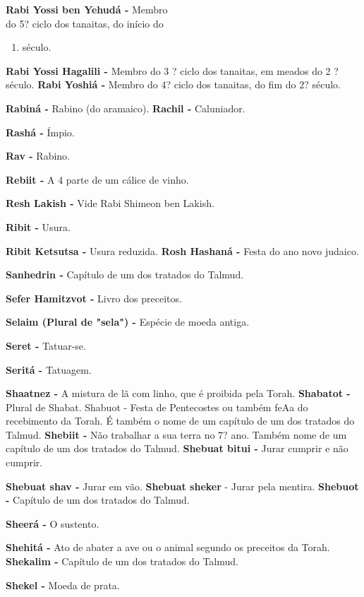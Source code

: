 \textbf{Rabi Yossi ben Yehudá -} Membro\\
do 5? ciclo dos tanaitas, do início do

\begin{enumerate}
\def\labelenumi{\arabic{enumi}.}
\setcounter{enumi}{2}
\item
  século.
\end{enumerate}

\textbf{Rabi Yossi Hagalili -} Membro do 3 ? ci­clo dos tanaitas, em
meados do 2 ? século. \textbf{Rabi Yoshiá -} Membro do 4? ciclo dos
tanaitas, do fim do 2? século.

\textbf{Rabiná -} Rabino (do aramaico). \textbf{Rachil -} Caluniador.

\textbf{Rashá -} Ímpio.

\textbf{Rav -} Rabino.

\textbf{Rebiit -} A 4 parte de um cálice de vinho.

\textbf{Resh Lakish -} Vide Rabi Shimeon ben Lakish.

\textbf{Ribit -} Usura.

\textbf{Ribit Ketsutsa -} Usura reduzida. \textbf{Rosh Hashaná -} Festa
do ano novo ju­daico.

\textbf{Sanhedrin -} Capítulo de um dos tra­tados do Talmud.

\textbf{Sefer Hamitzvot -} Livro dos precei­tos.

\textbf{Selaim (Plural de "sela") -} Espécie de moeda antiga.

\textbf{Seret -} Tatuar-se.

\textbf{Seritá -} Tatuagem.

\textbf{Shaatnez -} A mistura de lã com linho, que é proibida pela
Torah. \textbf{Shabatot -} Plural de Shabat. Shabuot - Festa de
Pentecostes ou também feAa do recebimento da To­rah. É também o nome de
um capítu­lo de um dos tratados do Talmud. \textbf{Shebiit -} Não
trabalhar a sua terra no 7? ano. Também nome de um capítu­lo de um dos
tratados do Talmud. \textbf{Shebuat bitui -} Jurar cumprir e não
cumprir.

\textbf{Shebuat shav -} Jurar em vão. \textbf{Shebuat sheker} - Jurar
pela mentira. \textbf{Shebuot -} Capítulo de um dos trata­dos do Talmud.

\textbf{Sheerá -} O sustento.

\textbf{Shehitá -} Ato de abater a ave ou o ani­mal segundo os preceitos
da Torah. \textbf{Shekalim -} Capítulo de um dos trata­dos do Talmud.

\textbf{Shekel -} Moeda de prata.

